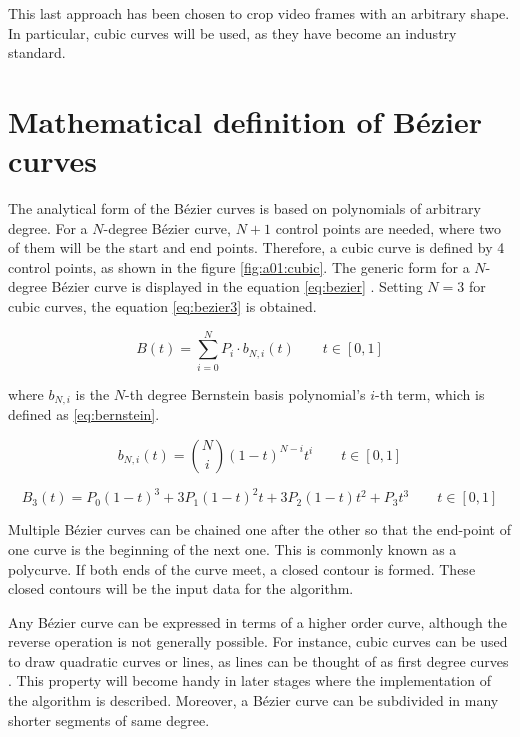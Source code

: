 \documentclass[\topdir/main.tex]{subfiles}
\begin{document}
This last approach has been chosen to crop video frames with an arbitrary shape. In particular, cubic curves will be used, as they have become an industry standard.

\section{Mathematical definition of Bézier curves}
The analytical form of the Bézier curves is based on polynomials of arbitrary degree. For a $N$-degree Bézier curve, $N+1$ control points are needed, where two of them will be the start and end points. Therefore, a cubic curve is defined by 4 control points, as shown in the figure \ref{fig:a01:cubic}. The generic form for a $N$-degree Bézier curve is displayed in the equation \eqref{eq:bezier} \cite{pomax:bezier, wiki:bezier}. Setting $N=3$ for cubic curves, the equation \eqref{eq:bezier3} is obtained.\newline

\begin{equation} \label{eq:bezier}
    B(t) = \sum_{i = 0}^{N} P_i \cdot b_{N,i}(t) \qquad t \in [0, 1]
\end{equation}

where $b_{N,i}$ is the $N$-th degree Bernstein basis polynomial's $i$-th term, which is defined as \eqref{eq:bernstein}.\newline

\begin{equation} \label{eq:bernstein}
    b_{N,i}(t) = \binom{N}{i} (1-t)^{N-i} t^i \qquad t \in [0, 1]
\end{equation}

\begin{equation} \label{eq:bezier3}
    B_3(t) = P_0(1-t)^3 + 3P_1(1-t)^2t + 3P_2(1-t)t^2 + P_3t^3 \qquad t \in [0, 1]
\end{equation}

Multiple Bézier curves can be chained one after the other so that the end-point of one curve is the beginning of the next one. This is commonly known as a polycurve. If both ends of the curve meet, a closed contour is formed. These closed contours will be the input data for the algorithm.\newline 

Any Bézier curve can be expressed in terms of a higher order curve, although the reverse operation is not generally possible. For instance, cubic curves can be used to draw quadratic curves or lines, as lines can be thought of as first degree curves \cite{pomax:bezier}. This property will become handy in later stages where the implementation of the algorithm is described. Moreover, a Bézier curve can be subdivided in many shorter segments of same degree.\newline
\end{document}
